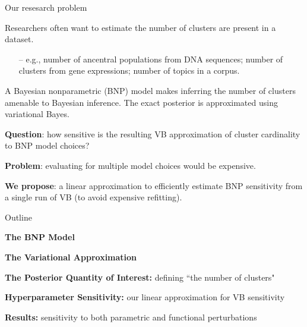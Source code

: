 \documentclass[10pt]{beamer}\usepackage[]{graphicx}\usepackage[]{color}
\begin{document}
\begin{frame}{Our resesarch problem}

Researchers often want to estimate the number of clusters are present in a dataset. 
\vspace{-0.1in}
\pause
\begin{itemize}
\item[--] e.g., number of ancentral populations from DNA sequences; number of clusters from gene expressions; number of topics in a corpus. 
\end{itemize}

\pause

A Bayesian nonparametric (BNP) model makes inferring the number of clusters amenable to
Bayesian inference. The exact posterior is approximated using variational Bayes. 

\pause

\textbf{Question}: how sensitive is the resulting
VB approximation of cluster cardinality to BNP model choices? 

\pause 

\textbf{Problem}: evaluating for multiple model choices would be expensive. 

\pause 

\textbf{We propose}: a linear approximation to efficiently
estimate BNP sensitivity from a single run of VB (to avoid
expensive refitting). 

\end{frame}

\begin{frame}{Outline}

{\bf The BNP Model}
\vspace{0.1in}

{\bf The Variational Approximation}
\vspace{0.1in}

{\bf The Posterior Quantity of Interest:} defining ``the number of clusters"
\vspace{0.1in}

{\bf Hyperparameter Sensitivity:} our linear approximation for VB sensitivity
\vspace{0.1in}

{\bf Results:} sensitivity to both parametric and functional perturbations
\vspace{0.1in}

\end{frame}
\end{document}
